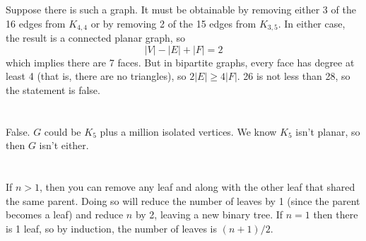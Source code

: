 \documentclass[12pt]{article}
\begin{document}
\section{}
\noindent{}\bigskip\par
Suppose there is such a graph. It must be obtainable by removing either 3 of the 16 edges from $K_{4,4}$ or by removing 2 of the 15 edges from $K_{3,5}$. In either case, the result is a connected planar graph, so
\[ |V|-|E|+|F|=2 \]
which implies there are 7 faces. But in bipartite graphs, every face has degree at least 4 (that is, there are no triangles), so $2|E|\geq 4|F|$. 26 is not less than 28, so the statement is false.

\section{}
\noindent{}\bigskip\par
False. $G$ could be $K_5$ plus a million isolated vertices. We know $K_5$ isn't planar, so then $G$ isn't either.

\section{}
\noindent{}\bigskip\par
If $n>1$, then you can remove any leaf and along with the other leaf that shared the same parent. Doing so will reduce the number of leaves by 1 (since the parent becomes a leaf) and reduce $n$ by 2, leaving a new binary tree. If $n=1$ then there is 1 leaf, so by induction, the number of leaves is $(n+1)/2$.
\end{document}
